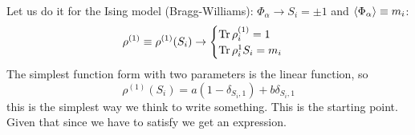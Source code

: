 \documentclass[../main/main.tex]{subfiles}
\begin{document}
Let us do it for the Ising model (Bragg-Williams): \( \Phi _ \alpha \rightarrow S_i = \pm 1 \) and \( \expval{\Phi _ \alpha } \equiv m_i \):
\begin{equation}
  \rho ^{(1)} \equiv \rho ^{(1)} (S_i) \rightarrow \begin{cases}
    \Tr \rho _i ^{(1)} = 1 \\
    \Tr \rho _i ^{1} S_i = m_i
\end{cases}
\end{equation}
The simplest function form with two parameters is the linear function, so
\begin{equation}
  \rho^{(1)} (S_i) = a (1- \delta _{S_i,1}) + b \delta _{S_i,1}
\end{equation}
this is the simplest way we think to write something. This is the starting point. Given that since we have to satisfy we get an expression.
\end{document}
